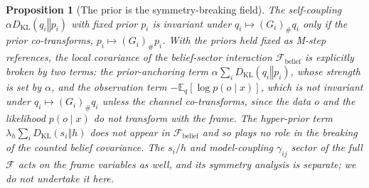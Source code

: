 \documentclass[11pt]{article}
\theoremstyle{plain}
\newtheorem{proposition}{Proposition}[section]
\theoremstyle{definition}
\newcommand{\KL}[2]{D_{\mathrm{KL}}\mathopen{}\left(#1 \mathbin{\Vert} #2\right)\mathclose{}}
\newcommand{\E}{\mathbb{E}}
\newcommand{\Fcal}{\mathcal{F}}
\newcommand{\gammaij}{\gamma_{ij}}
\begin{document}
\begin{proposition}[The prior is the symmetry-breaking field]
\label{prop:breaking}
The self-coupling $\alpha\KL{q_i}{p_i}$ with fixed prior $p_i$ is invariant under
$q_i\mapsto(G_i)_{\#}q_i$ only if the prior co-transforms, $p_i\mapsto(G_i)_{\#}p_i$.
With the priors held fixed as M-step references, the local covariance of the
belief-sector interaction $\Fcal_{\mathrm{belief}}$ is explicitly broken by two terms: the
prior-anchoring term $\alpha\sum_i\KL{q_i}{p_i}$, whose strength is set by $\alpha$, and the
observation term $-\E_q[\log p(o\mid x)]$, which is not invariant under $q_i\mapsto(G_i)_{\#}q_i$
unless the channel co-transforms, since the data $o$ and the likelihood $p(o\mid x)$ do not
transform with the frame. The hyper-prior term $\lambda_h\sum_i\KL{s_i}{h}$ does not appear in
$\Fcal_{\mathrm{belief}}$ and so plays no role in the breaking of the counted belief covariance.
The $s_i/h$ and model-coupling $\gammaij$ sector of the full $\Fcal$ acts on the frame variables
as well, and its symmetry analysis is separate; we do not undertake it here.
\end{proposition}
\end{document}

